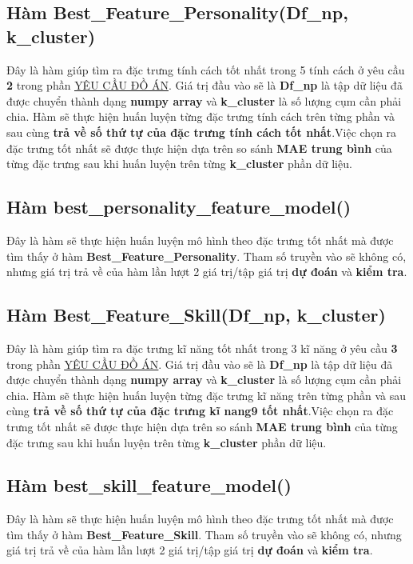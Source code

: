 \documentclass{report}
\begin{document}
\subsection{Hàm Best\_Feature\_Personality(Df\_np, k\_cluster)}
    Đây là hàm giúp tìm ra đặc trưng tính cách tốt nhất trong 5 tính cách ở yêu cầu \textbf{2} trong phần \hyperref[sec:requirement]{\underline{YÊU CẦU ĐỒ ÁN}}. Giá trị đầu vào sẽ là \textbf{Df\_np} là tập dữ liệu đã được chuyển thành dạng \textbf{numpy array} và \textbf{k\_cluster} là số lượng cụm cần phải chia. Hàm sẽ thực hiện huấn luyện từng đặc trưng tính cách trên từng phần và sau cùng \textbf{trả về số thứ tự của đặc trưng tính cách tốt nhất}.Việc chọn ra đặc trưng tốt nhất sẽ được thực hiện dựa trên so sánh \textbf{MAE trung bình} của từng đặc trưng sau khi huấn luyện trên từng \textbf{k\_cluster} phần dữ liệu.

\subsection{Hàm best\_personality\_feature\_model()}\label{sec:bestpersonalityfeaturemodel}
    Đây là hàm sẽ thực hiện huấn luyện mô hình theo đặc trưng tốt nhất mà được tìm thấy ở hàm \textbf{Best\_Feature\_Personality}. Tham số truyền vào sẽ không có, nhưng giá trị trả về của hàm lần lượt 2 giá trị/tập giá trị \textbf{dự đoán} và \textbf{kiểm tra}.

\subsection{Hàm Best\_Feature\_Skill(Df\_np, k\_cluster)}\label{sec:BestFeatureSkill}
    Đây là hàm giúp tìm ra đặc trưng kĩ năng tốt nhất trong 3 kĩ năng ở yêu cầu \textbf{3} trong phần \hyperref[sec:requirement]{\underline{YÊU CẦU ĐỒ ÁN}}. Giá trị đầu vào sẽ là \textbf{Df\_np} là tập dữ liệu đã được chuyển thành dạng \textbf{numpy array} và \textbf{k\_cluster} là số lượng cụm cần phải chia. Hàm sẽ thực hiện huấn luyện từng đặc trưng kĩ năng trên từng phần và sau cùng \textbf{trả về số thứ tự của đặc trưng kĩ nang9 tốt nhất}.Việc chọn ra đặc trưng tốt nhất sẽ được thực hiện dựa trên so sánh \textbf{MAE trung bình} của từng đặc trưng sau khi huấn luyện trên từng \textbf{k\_cluster} phần dữ liệu.

\subsection{Hàm best\_skill\_feature\_model()}\label{sec:bestskillfeaturemodel}
    Đây là hàm sẽ thực hiện huấn luyện mô hình theo đặc trưng tốt nhất mà được tìm thấy ở hàm \textbf{Best\_Feature\_Skill}. Tham số truyền vào sẽ không có, nhưng giá trị trả về của hàm lần lượt 2 giá trị/tập giá trị \textbf{dự đoán} và \textbf{kiểm tra}.
\end{document}
